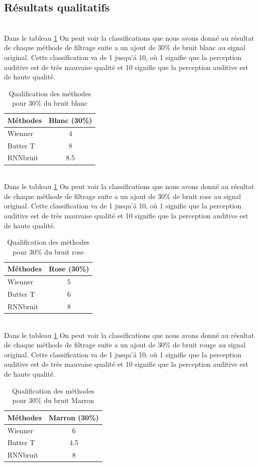 \documentclass[conference,onecolumn]{IEEEtran}
\begin{document}
\subsection{Résultats qualitatifs}
\hfill \\
Dans le tableau \ref{table:t4} On peut voir la classifications que nous avons donné au résultat de chaque méthode de filtrage suite a un ajout de 30\% de bruit blanc au signal original. Cette classification va de 1 jusqu'á 10, où 1 signifie que la perception auditive est de très mauvaise qualité et 10 signifie que la perception auditive est de haute qualité.
\begin{table}[hbt!]
    \centering
    \begin{tabular}{ l  c }
    \textbf{Méthodes} & \textbf{Blanc (30\%)} \\
    \hline
    Wienner &  4\\
    Butter T &  8 \\
    RNNbruit &  8.5 \\
    \end{tabular}
    \caption{Qualification des méthodes pour 30\% du bruit blanc}
    \label{table:t4}
\end{table}
\hfill \\
Dans le tableau \ref{table:t4} On peut voir la classifications que nous avons donné au résultat de chaque méthode de filtrage suite a un ajout de 30\% de bruit rose au signal original. Cette classification va de 1 jusqu'á 10, où 1 signifie que la perception auditive est de très mauvaise qualité et 10 signifie que la perception auditive est de haute qualité.  
\begin{table}[hbt!]
    \centering
    \begin{tabular}{ l  c }
    \textbf{Méthodes} & \textbf{Rose (30\%)} \\
    \hline
    Wienner & 5 \\
    Butter T &  6 \\
    RNNbruit &  8 \\
    \end{tabular}
    \caption{Qualification des méthodes pour 30\% du bruit rose}
    \label{table:t5}
\end{table}
\hfill \\
Dans le tableau \ref{table:t4} On peut voir la classifications que nous avons donné au résultat de chaque méthode de filtrage suite a un ajout de 30\% de bruit rouge au signal original. Cette classification va de 1 jusqu'á 10, où 1 signifie que la perception auditive est de très mauvaise qualité et 10 signifie que la perception auditive est de haute qualité.
\begin{table}[hbt!]
    \centering
    \begin{tabular}{ l  c }
    \textbf{Méthodes} & \textbf{Marron (30\%)} \\
    \hline
    Wienner & 6  \\
    Butter T &  4.5 \\
    RNNbruit & 8 \\
    \end{tabular}
    \caption{Qualification des méthodes pour 30\% du bruit Marron}
    \label{table:t6}
\end{table}
\hfill \\
\end{document}
